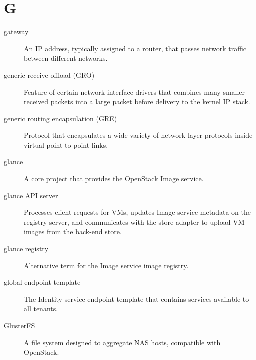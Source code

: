 \documentclass[letterpaper,10pt,english]{sphinxmanual}
\begin{document}
\section{G}
\label{_source/glossary:g}\begin{description}
\item[{gateway}] \leavevmode{}\label{_source/glossary:term-gateway}
An IP address, typically assigned to a router, that
passes network traffic between different networks.

\item[{generic receive offload (GRO)}] \leavevmode{}\label{_source/glossary:term-generic-receive-offload-gro}
Feature of certain network interface drivers that
combines many smaller received packets into a large packet
before delivery to the kernel IP stack.

\item[{generic routing encapsulation (GRE)}] \leavevmode{}\label{_source/glossary:term-generic-routing-encapsulation-gre}
Protocol that encapsulates a wide variety of network
layer protocols inside virtual point-to-point links.

\item[{glance}] \leavevmode{}\label{_source/glossary:term-glance}
A core project that provides the OpenStack Image service.

\item[{glance API server}] \leavevmode{}\label{_source/glossary:term-glance-api-server}
Processes client requests for VMs, updates Image service
metadata on the registry server, and communicates with the store
adapter to upload VM images from the back-end store.

\item[{glance registry}] \leavevmode{}\label{_source/glossary:term-glance-registry}
Alternative term for the Image service image registry.

\item[{global endpoint template}] \leavevmode{}\label{_source/glossary:term-global-endpoint-template}
The Identity service endpoint template that contains services
available to all tenants.

\item[{GlusterFS}] \leavevmode{}\label{_source/glossary:term-glusterfs}
A file system designed to aggregate NAS hosts, compatible with
OpenStack.


\end{description}
\end{document}

